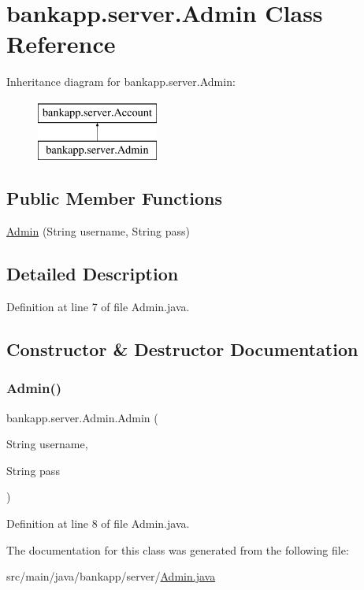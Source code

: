 \hypertarget{classbankapp_1_1server_1_1_admin}{}\section{bankapp.\+server.\+Admin Class Reference}
\label{classbankapp_1_1server_1_1_admin}
Inheritance diagram for bankapp.\+server.\+Admin\+:\begin{figure}[H]
\begin{center}
\leavevmode
\includegraphics[height=2.000000cm]{classbankapp_1_1server_1_1_admin}
\end{center}
\end{figure}
\subsection*{Public Member Functions}
\begin{DoxyCompactItemize}
\item 
\hyperlink{classbankapp_1_1server_1_1_admin_a18a9fdce301d47d8f65febe728e2ae43}{Admin} (String username, String pass)
\end{DoxyCompactItemize}


\subsection{Detailed Description}


Definition at line 7 of file Admin.\+java.



\subsection{Constructor \& Destructor Documentation}
\mbox{\label{classbankapp_1_1server_1_1_admin_a18a9fdce301d47d8f65febe728e2ae43}} 
\subsubsection{\texorpdfstring{Admin()}{Admin()}}
{\footnotesize\ttfamily bankapp.\+server.\+Admin.\+Admin (\begin{DoxyParamCaption}\item[{String}]{username,  }\item[{String}]{pass }\end{DoxyParamCaption})}



Definition at line 8 of file Admin.\+java.



The documentation for this class was generated from the following file\+:\begin{DoxyCompactItemize}
\item 
src/main/java/bankapp/server/\hyperlink{_admin_8java}{Admin.\+java}\end{DoxyCompactItemize}
